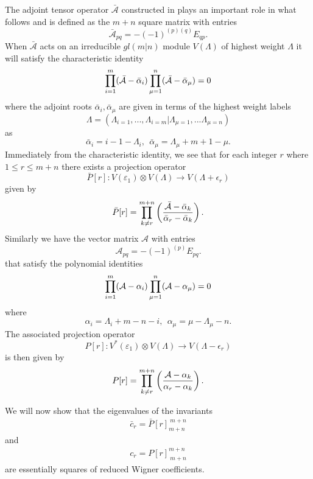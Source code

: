 \documentclass[12pt]{article}
\def\nn{\nonumber}
\begin{document}
The adjoint tensor operator $\bar{\mathcal{A}}$ constructed in \cite{GIW1} plays an important role in what follows and is defined as the $m+n$ square matrix with entries
$$
\bar{\mathcal{A}}_{pq} = -(-1)^{(p)(q)} E_{qp}.
$$
When $\bar{\mathcal{A}}$ acts on an irreducible $gl(m|n)$ module $V(\Lambda)$ of highest weight $\Lambda$ it will satisfy the characteristic identity
\begin{align}
\prod_{i=1}^m ({\cal \bar{A}} - \bar{\alpha}_i) \prod^n_{\mu = 1} ({\cal \bar{A}} - \bar{\alpha}_\mu) = 0
\label{CharIdent1}
\end{align}
where the adjoint roots $\bar{\alpha}_i, \bar{\alpha}_\mu$ are given in terms of the highest weight labels
$$
\Lambda = (\Lambda_{i=1},...,\Lambda_{i=m}|\Lambda_{\mu=1},...\Lambda_{\mu=n})
$$
as
$$
{\bar{\alpha}}_i= i - 1 -\Lambda_i ,~~ {\bar{\alpha}}_\mu = \Lambda_\mu + m + 1 - \mu. 
$$
Immediately from the characteristic identity, we see that for each integer $r$ where $1 \leq  r \leq m+n$ there exists a projection operator 
$$
\bar{P}[r]: V(\varepsilon_1) \otimes V(\Lambda) \longrightarrow V(\Lambda + \epsilon_r)
$$
given by
\begin{align*}
\bar{P}[r] = \prod^{m+n}_{k \neq r} \left( \frac{{\cal \bar{A}} - \bar{\alpha}_k}{\bar{\alpha}_r
- \bar{\alpha}_k} \right)\nn.
\end{align*}
Similarly we have the vector matrix $\mathcal{A}$ with entries
$$
\mathcal{A}_{pq} = -(-1)^{(p)} E_{pq}.
$$
that satisfy the polynomial identities
\begin{align}
\prod_{i=1}^m ({\cal A} - \alpha_i) \prod^n_{\mu = 1} ({\cal A} - \alpha_\mu) = 0
\label{CharIdent2}
\end{align}
where
$$
{\alpha}_i= \Lambda_i + m - n - i ,~~ {\alpha}_\mu = \mu - \Lambda_\mu -n. 
$$
The associated projection operator 
$$
P[r]: V^*(\varepsilon_1) \otimes V(\Lambda) \longrightarrow V(\Lambda - \epsilon_r)
$$
is then given by
\begin{align*}
P[r] = \prod^{m+n}_{k \neq r} \left( \frac{{\cal A} - \alpha_k}{\alpha_r
- \alpha_k} \right)\nn.
\end{align*}

We will now show that the eigenvalues of the invariants 
\begin{align*}
\bar{c}_r = \bar{P}[r]_{m+n}^{\ m+n}
\end{align*}
and 
\begin{align*}
c_r = P[r]_{\ m+n}^{m+n}
\end{align*}
are essentially squares of reduced Wigner coefficients. 
\end{document}
